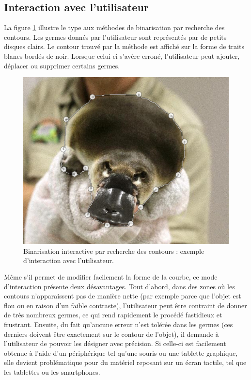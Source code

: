 \subsection{Interaction avec l'utilisateur}

La figure \ref{fig:sota_boundary_based_ihm} illustre le type  aux méthodes de binarisation par recherche des contours. Les germes donnés par l'utilisateur sont représentés par de petits disques clairs. Le contour trouvé par la méthode est affiché sur la forme de traits blancs bordés de noir. Lorsque celui-ci s'avère erroné, l'utilisateur peut ajouter, déplacer ou supprimer certains germes. 

\begin{figure}[htb]
	\centering
			\includegraphics[height=0.35\textheight]{images/etat-de-l-art/boundary-based-method2}
		 \caption{Binarisation interactive par recherche des contours : exemple d'interaction avec l'utilisateur. }
		 \label{fig:sota_boundary_based_ihm}
\end{figure}

Même s'il permet de modifier facilement la forme de la courbe, ce mode d'interaction présente deux désavantages. Tout d'abord, dans des zones où les contours n'apparaissent pas de manière nette (par exemple parce que l'objet est flou ou en raison d'un faible contraste), l'utilisateur peut être contraint de donner de très nombreux germes, ce qui rend rapidement le procédé fastidieux et frustrant. Ensuite, du fait qu'aucune erreur n'est tolérée dans les germes (ces derniers doivent être exactement sur le contour de l'objet), il demande à l'utilisateur de pouvoir les désigner avec précision. Si celle-ci est facilement obtenue à l'aide d'un périphérique tel qu'une souris ou une tablette graphique, elle devient problématique pour du matériel reposant sur un écran tactile, tel que les tablettes ou les smartphones. 

